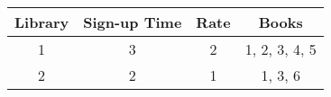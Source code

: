 \begin{tabular}{cccc}
  \toprule
  Library & Sign-up Time & Rate & Books         \\
  \midrule
  1       & 3            & 2    & 1, 2, 3, 4, 5 \\
  2       & 2            & 1    & 1, 3, 6       \\
  \bottomrule
\end{tabular}